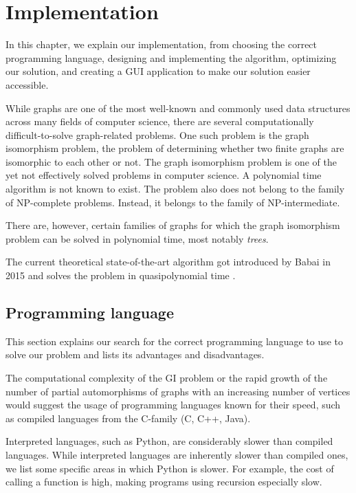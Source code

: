 \chapter{Implementation}\label{chap:implementation}

In this chapter, we explain our implementation, from choosing the correct programming language, designing and implementing the algorithm, optimizing our solution, and creating a GUI application to make our solution easier accessible.

While graphs are one of the most well-known and commonly used data structures across many fields of computer science, there are several computationally difficult-to-solve graph-related problems. One such problem is the graph isomorphism problem, the problem of determining whether two finite graphs are isomorphic to each other or not. The graph isomorphism problem is one of the yet not effectively solved problems in computer science. A polynomial time algorithm is not known to exist. The problem also does not belong to the family of NP-complete problems. Instead, it belongs to the family of NP-intermediate.

There are, however, certain families of graphs for which the graph isomorphism problem can be solved in polynomial time, most notably \emph{trees}.

The current theoretical state-of-the-art algorithm got introduced by Babai in 2015 and solves the problem in quasipolynomial time \cite{babai}.

\section{Programming language}

This section explains our search for the correct programming language to use to solve our problem and lists its advantages and disadvantages.

The computational complexity of the GI problem or the rapid growth of the number of partial automorphisms of graphs with an increasing number of vertices would suggest the usage of programming languages known for their speed, such as compiled languages from the C-family (C, C++, Java).

Interpreted languages, such as Python, are considerably slower than compiled languages. While interpreted languages are inherently slower than compiled ones, we list some specific areas in which Python is slower. For example, the cost of calling a function is high, making programs using recursion especially slow.

